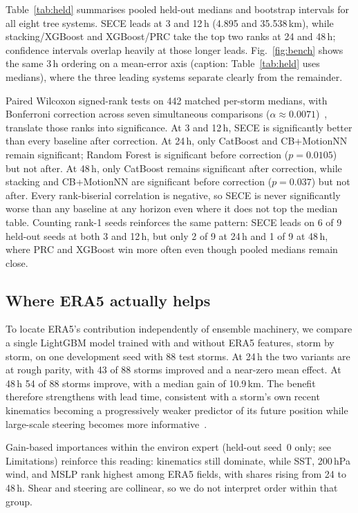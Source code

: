 \documentclass[conference]{IEEEtran}
\newcommand{\sece}{SECE}
\newcommand{\era}{ERA5}
\begin{document}
Table~\ref{tab:held} summarises pooled held-out medians and bootstrap intervals
for all eight tree systems. \sece{} leads at 3 and 12\,h (4.895 and 35.538\,km),
while stacking/XGBoost and XGBoost/PRC take the top two ranks at 24 and 48\,h;
confidence intervals overlap heavily at those longer leads. Fig.~\ref{fig:bench}
shows the same 3\,h ordering on a mean-error axis (caption: Table~\ref{tab:held}
uses medians), where the three leading systems separate clearly from the remainder.

Paired Wilcoxon signed-rank tests on 442 matched per-storm medians, with
Bonferroni correction across seven simultaneous comparisons ($\alpha \approx
0.0071$)~\cite{wilcoxon1945,bonferroni1936},
translate those ranks into significance. At 3 and 12\,h, \sece{} is significantly
better than every baseline after correction. At 24\,h, only CatBoost and
CB+MotionNN remain significant; Random Forest is significant before correction
($p=0.0105$) but not after. At 48\,h, only CatBoost remains significant after
correction, while stacking and CB+MotionNN are significant before correction
($p=0.037$) but not after. Every rank-biserial correlation is negative, so
\sece{} is never significantly worse than any baseline at any horizon even where
it does not top the median table. Counting rank-1 seeds reinforces the same
pattern: \sece{} leads on 6 of 9 held-out seeds at both 3 and 12\,h, but only
2 of 9 at 24\,h and 1 of 9 at 48\,h, where PRC and XGBoost win more often even
though pooled medians remain close.

\subsection{Where ERA5 actually helps}
To locate \era{}'s contribution independently of ensemble machinery, we compare a
single LightGBM model trained with and without \era{} features, storm by storm,
on one development seed with 88 test storms. At 24\,h the two variants are at
rough parity, with 43 of 88 storms improved and a near-zero mean effect. At 48\,h
54 of 88 storms improve, with a median gain of 10.9\,km. The benefit therefore
strengthens with lead time, consistent with a storm's own recent kinematics
becoming a progressively weaker predictor of its future position while
large-scale steering becomes more
informative~\cite{giffard2020tropical,goerss2004tropical}.

Gain-based importances within the environ expert (held-out seed~0 only; see
Limitations) reinforce this reading: kinematics still dominate, while SST, 200\,hPa
wind, and MSLP rank highest among \era{} fields, with shares rising from 24 to
48\,h. Shear and steering are collinear, so we do not interpret order within that
group.
\end{document}
